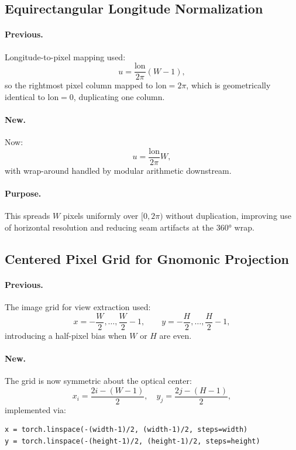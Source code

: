 \documentclass[11pt,a4paper]{article}
\begin{document}
\subsection{Equirectangular Longitude Normalization}

\paragraph{Previous.}
Longitude-to-pixel mapping used:
\begin{equation}
    u = \frac{\text{lon}}{2\pi}(W-1),
\end{equation}
so the rightmost pixel column mapped to \(\text{lon}=2\pi\), which is geometrically identical to \(\text{lon}=0\), duplicating one column.

\paragraph{New.}
Now:
\begin{equation}
    u = \frac{\text{lon}}{2\pi}W,
\end{equation}
with wrap-around handled by modular arithmetic downstream.

\paragraph{Purpose.}
This spreads \(W\) pixels uniformly over \([0,2\pi)\) without duplication, improving use of horizontal resolution and reducing seam artifacts at the 360° wrap.

\subsection{Centered Pixel Grid for Gnomonic Projection}

\paragraph{Previous.}
The image grid for view extraction used:
\[
    x = -\frac{W}{2},\dots,\frac{W}{2}-1,\qquad
    y = -\frac{H}{2},\dots,\frac{H}{2}-1,
\]
introducing a half-pixel bias when \(W\) or \(H\) are even.

\paragraph{New.}
The grid is now symmetric about the optical center:
\begin{equation}
    x_i = \frac{2i-(W-1)}{2},\quad
    y_j = \frac{2j-(H-1)}{2},
\end{equation}
implemented via:
\begin{lstlisting}
x = torch.linspace(-(width-1)/2, (width-1)/2, steps=width)
y = torch.linspace(-(height-1)/2, (height-1)/2, steps=height)
\end{lstlisting}
\end{document}

